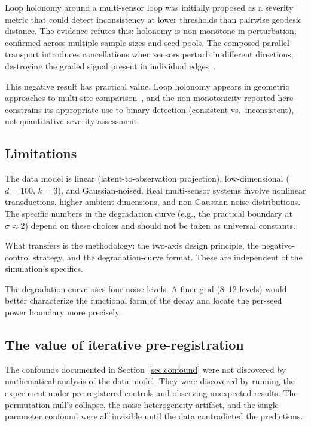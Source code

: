 \documentclass[11pt]{article}
\begin{document}
Loop holonomy around a multi-sensor loop was initially proposed as
a severity metric that could detect inconsistency at lower
thresholds than pairwise geodesic distance.  The evidence refutes
this: holonomy is non-monotone in perturbation, confirmed across
multiple sample sizes and seed pools.  The composed parallel
transport introduces cancellations when sensors perturb in
different directions, destroying the graded signal present in
individual edges~\citep{absil2008optimization}.

This negative result has practical value.  Loop holonomy appears in
geometric approaches to multi-site
comparison~\citep{bendokat2024grassmann}, and the non-monotonicity
reported here constrains its appropriate use to binary detection
(consistent vs.\ inconsistent), not quantitative severity
assessment.

\subsection{Limitations}

The data model is linear (latent-to-observation projection),
low-dimensional ($d = 100$, $k = 3$), and Gaussian-noised.  Real
multi-sensor systems involve nonlinear transductions, higher
ambient dimensions, and non-Gaussian noise distributions.  The
specific numbers in the degradation curve (e.g., the practical
boundary at $\sigma \approx 2$) depend on these choices and should
not be taken as universal constants.

What transfers is the methodology: the two-axis design principle,
the negative-control strategy, and the degradation-curve format.
These are independent of the simulation's specifics.

The degradation curve uses four noise levels.  A finer grid (8--12
levels) would better characterize the functional form of the
decay and locate the per-seed power boundary more precisely.

\subsection{The value of iterative pre-registration}

The confounds documented in Section~\ref{sec:confound} were not
discovered by mathematical analysis of the data model.  They were
discovered by running the experiment under pre-registered controls
and observing unexpected results.  The permutation null's collapse,
the noise-heterogeneity artifact, and the single-parameter
confound were all invisible until the data contradicted the
predictions.
\end{document}
